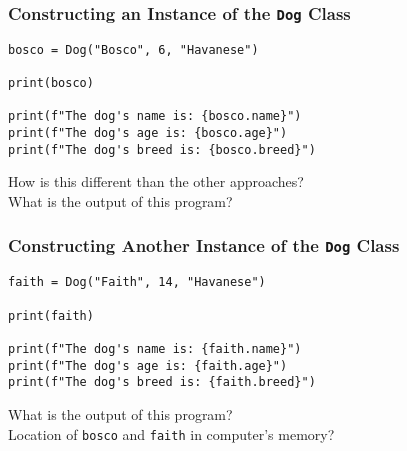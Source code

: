 \documentclass[14pt,aspectratio=169]{beamer}
\begin{document}
%
\begin{frame}[fragile]
  \frametitle{Constructing an Instance of the {\tt Dog} Class}
  \hspace*{-.1in}
  \begin{minipage}{6in}
    \vspace*{.2in}
    \begin{verbatim}
bosco = Dog("Bosco", 6, "Havanese")

print(bosco)

print(f"The dog's name is: {bosco.name}")
print(f"The dog's age is: {bosco.age}")
print(f"The dog's breed is: {bosco.breed}")
    \end{verbatim}
  \end{minipage}
  \vspace*{.1in}
  \begin{center}
    \normalsize \noindent How is this different than the other approaches? \\
    \normalsize \noindent What is the output of this program? \\
  \end{center}
\end{frame}

%
\begin{frame}[fragile]
  \frametitle{Constructing Another Instance of the {\tt Dog} Class}
  \hspace*{-.1in}
  \begin{minipage}{6in}
    \vspace*{.2in}
    \begin{verbatim}
faith = Dog("Faith", 14, "Havanese")

print(faith)

print(f"The dog's name is: {faith.name}")
print(f"The dog's age is: {faith.age}")
print(f"The dog's breed is: {faith.breed}")
    \end{verbatim}
  \end{minipage}
  \vspace*{.1in}
  \begin{center}
    \normalsize \noindent What is the output of this program? \\
    \normalsize \noindent Location of {\tt bosco} and {\tt faith} in computer's
    memory? \\
  \end{center}
\end{frame}
\end{document}
